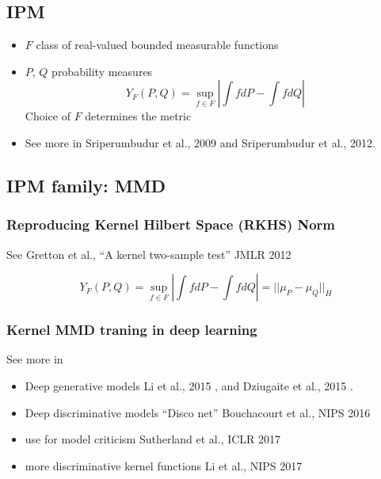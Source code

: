 \documentclass[b5paper]{report}
\begin{document}
\subsection{IPM}

\begin{itemize}
  \item $F$ class of real-valued bounded measurable functions
  \item $P$, $Q$ probability measures
    \begin{equation}
      Y_F(P,Q) = \sup_{f \in F} \left| \int fdP - \int fdQ \right|
    \end{equation}
  Choice of $F$ determines the metric
\item See more in Sriperumbudur et al., 2009 and Sriperumbudur et al., 2012.
\end{itemize}

\subsection{IPM family: MMD}


\subsubsection{Reproducing Kernel Hilbert Space (RKHS) Norm}

See Gretton et al., ``A kernel two-sample test'' JMLR 2012
\cite{gretton2012kernel}


\begin{equation}
  Y_F(P,Q) = \sup_{f \in F} \left| \int fdP - \int fdQ \right| = || \mu_P -
  \mu_Q ||_H
\end{equation}

\subsubsection{Kernel MMD traning in deep learning}

See more in

\begin{itemize}
  \item Deep generative models Li et al., 2015 \cite{li2015generative}, and
    Dziugaite et al., 2015 \cite{dziugaite2015training}.
  \item Deep discriminative models ``Disco net'' Bouchacourt et al., NIPS 2016
    \cite{bouchacourt2016disco}
  \item use for model criticism Sutherland et al., ICLR 2017 \cite{sutherland2017soumyajit}
  \item more discriminative kernel functions Li et al., NIPS 2017
    \cite{li2017mmd}
\end{itemize}
\end{document}
